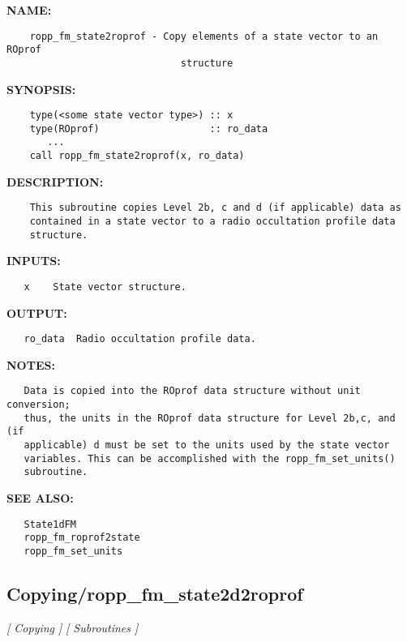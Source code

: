 \label{ch:robo33}
\label{ch:Copying_ropp_fm_state1d2roprof}
\textbf{NAME:}\hspace{0.08in}\begin{Verbatim}
    ropp_fm_state2roprof - Copy elements of a state vector to an ROprof
                              structure
\end{Verbatim}
\textbf{SYNOPSIS:}\hspace{0.08in}\begin{Verbatim}
    type(<some state vector type>) :: x 
    type(ROprof)                   :: ro_data
       ...
    call ropp_fm_state2roprof(x, ro_data)
\end{Verbatim}
\textbf{DESCRIPTION:}\hspace{0.08in}\begin{Verbatim}
    This subroutine copies Level 2b, c and d (if applicable) data as
    contained in a state vector to a radio occultation profile data
    structure.
\end{Verbatim}
\textbf{INPUTS:}\hspace{0.08in}\begin{Verbatim}
   x    State vector structure.
\end{Verbatim}
\textbf{OUTPUT:}\hspace{0.08in}\begin{Verbatim}
   ro_data  Radio occultation profile data.
\end{Verbatim}
\textbf{NOTES:}\hspace{0.08in}\begin{Verbatim}
   Data is copied into the ROprof data structure without unit conversion; 
   thus, the units in the ROprof data structure for Level 2b,c, and (if
   applicable) d must be set to the units used by the state vector
   variables. This can be accomplished with the ropp_fm_set_units()
   subroutine.
\end{Verbatim}
\textbf{SEE ALSO:}\hspace{0.08in}\begin{Verbatim}
   State1dFM
   ropp_fm_roprof2state
   ropp_fm_set_units
\end{Verbatim}
\subsection{Copying/ropp\_fm\_state2d2roprof}
\textsl{[ Copying ]}
\textsl{[ Subroutines ]}

